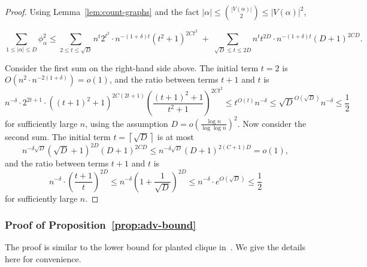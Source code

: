 \documentclass{article}
\begin{document}
\begin{proof}

Using Lemma~\ref{lem:count-graphs} and the fact $|\alpha| \le \binom{|V(\alpha)|}{2} \le |V(\alpha)|^2$, 

\[ \sum_{1 \le |\alpha| \le D} \phi_\alpha^2 \le \sum_{2 \le t \le \sqrt{D}} n^t 2^{t^2} \cdot n^{-(1+\delta)t} (t^2+1)^{2C t^2} \;+\; \sum_{\sqrt{D} \le t \le 2D} n^t t^{2D} \cdot n^{-(1+\delta)t} (D+1)^{2CD}. \]

\noindent Consider the first sum on the right-hand side above. The initial term $t = 2$ is $O(n^2 \cdot n^{-2(1+\delta)}) = o(1)$, and the ratio between terms $t+1$ and $t$ is
\[ n^{-\delta} \cdot 2^{2t+1} \cdot ((t+1)^2+1)^{2C(2t+1)} \left(\frac{(t+1)^2+1}{t^2+1}\right)^{2Ct^2} \le t^{O(t)} n^{-\delta} \le \sqrt{D}^{O(\sqrt{D})} n^{-\delta} \le \frac{1}{2} \]
for sufficiently large $n$, using the assumption $D = o\left(\frac{\log n}{\log \log n}\right)^2$.
Now consider the second sum. The initial term $t = \left\lceil \sqrt{D} \right\rceil$ is at most
\[ n^{-\delta \sqrt{D}} (\sqrt{D}+1)^{2D} (D+1)^{2CD} \le n^{-\delta \sqrt{D}} (D+1)^{2(C+1)D} = o(1), \]
and the ratio between terms $t+1$ and $t$ is
\[ n^{-\delta} \cdot \left(\frac{t+1}{t}\right)^{2D} \le n^{-\delta} \left(1 + \frac{1}{\sqrt D}\right)^{2D} \le n^{-\delta} \cdot e^{O(\sqrt{D})} \le \frac{1}{2} \]
for sufficiently large $n$.
\end{proof}





\subsubsection{Proof of Proposition~\ref{prop:adv-bound}}
\label{sec:pf-adv-bound}

The proof is similar to the lower bound for planted clique in~\cite[Section~3.5]{SW-recovery}. We give the details here for convenience.
\end{document}
